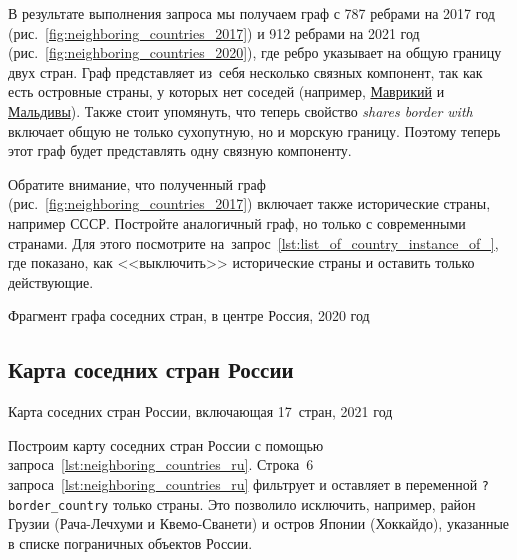 В результате выполнения запроса мы получаем граф с 787 ребрами на 2017 год 
(рис.~\ref{fig:neighboring_countries_2017}) 
и 912 ребрами на 2021 год (рис.~\ref{fig:neighboring_countries_2020}), 
где ребро указывает на общую границу двух стран. 
Граф представляет из~себя несколько связных компонент, 
так как есть островные страны, у которых нет соседей 
(например, \href{https://w.wiki/vC7}{Маврикий} и \href{https://w.wiki/vC8}{Мальдивы}). 
Также стоит упомянуть, что теперь свойство {\textit{shares border with}} 
включает общую не только сухопутную, но и морскую границу. 
Поэтому теперь этот граф будет представлять одну связную компоненту. 

Обратите внимание, что полученный граф (рис.~\ref{fig:neighboring_countries_2017}) 
включает также исторические страны, например СССР. 
Постройте аналогичный граф, но только с современными странами. 
Для этого посмотрите на~запрос~\ref{lst:list_of_country_instance_of_}, где показано, 
как <<выключить>> исторические страны и оставить только действующие. 

\begin{marginfigure}
	{
		\setlength{\fboxsep}{0pt}%
		\setlength{\fboxrule}{1pt}%
	}
    \caption[Фрагмент графа соседних стран, 2020 год.]{Фрагмент графа соседних стран, в центре Россия, 2020 год}
	\label{fig:neighboring_countries_2020}%
\end{marginfigure}



\newpage
\subsection{Карта соседних стран России}
%
\begin{marginfigure}[2\baselineskip]
	{
		\setlength{\fboxsep}{0pt}%
		\setlength{\fboxrule}{1pt}%
	}
    \caption[Карта соседних стран России, 2021 год.]{Карта соседних стран России, включающая 17~стран, 2021 год}
	\label{fig:neighboring_countries_ru_2020}%
\end{marginfigure}


Построим карту соседних стран России с помощью запроса~\ref{lst:neighboring_countries_ru}.
Строка~6 запроса~\ref{lst:neighboring_countries_ru} 
фильтрует и оставляет в переменной \lstinline|?border_country| только страны.
Это позволило исключить, например, район Грузии (Рача-Лечхуми и Квемо-Сванети) 
и остров Японии (Хоккайдо), указанные в списке пограничных объектов России.

